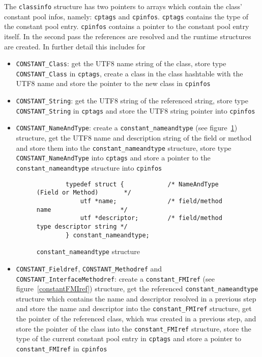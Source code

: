 The \texttt{classinfo} structure has two pointers to arrays which
contain the class' constant pool infos, namely: \texttt{cptags} and
\texttt{cpinfos}. \texttt{cptags} contains the type of the constant
pool entry. \texttt{cpinfos} contains a pointer to the constant pool
entry itself. In the second pass the references are resolved and the
runtime structures are created. In further detail this includes for

\begin{itemize}
 \item \texttt{CONSTANT\_Class}: get the UTF8 name string of the
 class, store type \texttt{CONSTANT\_Class} in \texttt{cptags}, create
 a class in the class hashtable with the UTF8 name and store the
 pointer to the new class in \texttt{cpinfos}

 \item \texttt{CONSTANT\_String}: get the UTF8 string of the
 referenced string, store type \texttt{CONSTANT\_String} in
 \texttt{cptags} and store the UTF8 string pointer into
 \texttt{cpinfos}

 \begingroup
 \item \texttt{CONSTANT\_NameAndType}: create a
 \texttt{constant\_nameandtype} (see
 figure~\ref{constantnameandtype}) structure, get the UTF8 name and
 description string of the field or method and store them into the
 \texttt{constant\_nameandtype} structure, store type
 \texttt{CONSTANT\_NameAndType} into \texttt{cptags} and store a
 pointer to the \texttt{constant\_nameandtype} structure into
 \texttt{cpinfos}

 \endgroup

\begin{figure}[h]
\begin{verbatim}
        typedef struct {            /* NameAndType (Field or Method)       */
            utf *name;              /* field/method name                   */
            utf *descriptor;        /* field/method type descriptor string */
        } constant_nameandtype;
\end{verbatim}
\caption{\texttt{constant\_nameandtype} structure}
\label{constantnameandtype}
\end{figure}

 \begingroup
 \item \texttt{CONSTANT\_Fieldref}, \texttt{CONSTANT\_Methodref} and
 \texttt{CONSTANT\_InterfaceMethodref}: create a
 \texttt{constant\_FMIref} (see figure~\ref{constantFMIref})
 structure, get the referenced \texttt{constant\_nameandtype}
 structure which contains the name and descriptor resolved in a
 previous step and store the name and descriptor into the
 \texttt{constant\_FMIref} structure, get the pointer of the
 referenced class, which was created in a previous step, and store the
 pointer of the class into the \texttt{constant\_FMIref} structure,
 store the type of the current constant pool entry in \texttt{cptags}
 and store a pointer to \texttt{constant\_FMIref} in \texttt{cpinfos}


\end{itemize}
